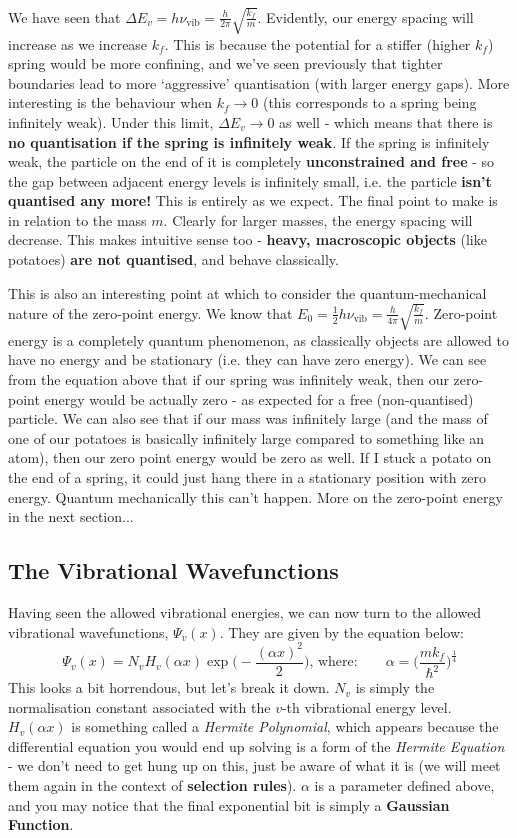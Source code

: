 \documentclass{memoir}[11pt,oneside,a4paper,openany]
\newcommand{\wf}{\ensuremath{\Psi}\xspace}
\newcommand{\nuv}{\ensuremath{\nu_{\text{vib}}}}
\begin{document}
We have seen that $\Delta E_v = h\nuv = \frac{h}{2\pi}\sqrt{\frac{k_f}{m}}$. Evidently, our energy spacing will increase as we increase $k_f$. This is because the potential for a stiffer (higher $k_f$) spring would be more confining, and we've seen previously that tighter boundaries lead to more `aggressive' quantisation (with larger energy gaps). More interesting is the behaviour when $k_f\rightarrow 0$ (this corresponds to a spring being infinitely weak). Under this limit, $\Delta E_v \rightarrow 0$ as well - which means that there is \textbf{no quantisation if the spring is infinitely weak}. If the spring is infinitely weak, the particle on the end of it is completely \textbf{unconstrained and free} - so the gap between adjacent energy levels is infinitely small, i.e. the particle \textbf{isn't quantised any more!} This is entirely as we expect. The final point to make is in relation to the mass $m$. Clearly for larger masses, the energy spacing will decrease. This makes intuitive sense too - \textbf{heavy, macroscopic objects} (like potatoes) \textbf{are not quantised}, and behave classically.

This is also an interesting point at which to consider the quantum-mechanical nature of the zero-point energy. We know that $E_0 = \frac{1}{2}h\nuv = \frac{h}{4\pi}\sqrt{\frac{k_f}{m}}$. Zero-point energy is a completely quantum phenomenon, as classically objects are allowed to have no energy and be stationary (i.e. they can have zero energy). We can see from the equation above that if our spring was infinitely weak, then our zero-point energy would be actually zero - as expected for a free (non-quantised) particle. We can also see that if our mass was infinitely large (and the mass of one of our potatoes is basically infinitely large compared to something like an atom), then our zero point energy would be zero as well. If I stuck a potato on the end of a spring, it could just hang there in a stationary position with zero energy. Quantum mechanically this can't happen. More on the zero-point energy in the next section... 

\subsection{The Vibrational Wavefunctions}
Having seen the allowed vibrational energies, we can now turn to the allowed vibrational wavefunctions, $\wf_v(x)$. They are given by the equation below:
\begin{equation}
	\wf_v(x) = N_vH_v(\alpha x)\exp{\bigg(-\frac{(\alpha x)^2}{2}\bigg)}, \,\text{where:} \qquad \alpha = \bigg(\frac{mk_f}{\hbar^2}\bigg)^{\frac{1}{4}}
\end{equation}
This looks a bit horrendous, but let's break it down. $N_v$ is simply the normalisation constant associated with the $v$-th vibrational energy level. $H_v(\alpha x)$ is something called a \emph{Hermite Polynomial}, which appears because the differential equation you would end up solving is a form of the \emph{Hermite Equation} - we don't need to get hung up on this, just be aware of what it is (we will meet them again in the context of \textbf{selection rules}). $\alpha$ is a parameter defined above, and you may notice that the final exponential bit is simply a \textbf{Gaussian Function}.
\end{document}
